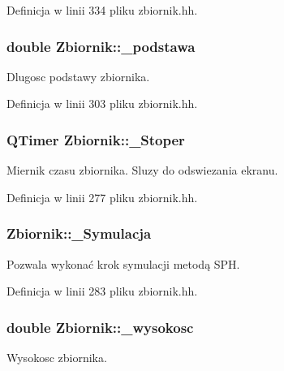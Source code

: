 Definicja w linii 334 pliku zbiornik.\-hh.

\hypertarget{class_zbiornik_aff57d3fb370566986df4eb58711cbfae}{
\subsubsection[{\-\_\-podstawa}]{\setlength{\rightskip}{0pt plus 5cm}double Zbiornik\-::\-\_\-podstawa\hspace{0.3cm}{\ttfamily [private]}}}\label{class_zbiornik_aff57d3fb370566986df4eb58711cbfae}
Dlugosc podstawy zbiornika. 

Definicja w linii 303 pliku zbiornik.\-hh.

\hypertarget{class_zbiornik_a5ca8ac1357ef59110d4a9e12aae2bd99}{
\subsubsection[{\-\_\-\-Stoper}]{\setlength{\rightskip}{0pt plus 5cm}Q\-Timer Zbiornik\-::\-\_\-\-Stoper}}\label{class_zbiornik_a5ca8ac1357ef59110d4a9e12aae2bd99}
Miernik czasu zbiornika. Sluzy do odswiezania ekranu. 

Definicja w linii 277 pliku zbiornik.\-hh.

\hypertarget{class_zbiornik_a2d1f5a0b8fb0085afcd66b730d6dd6a8}{
\subsubsection[{\-\_\-\-Symulacja}]{ Zbiornik\-::\-\_\-\-Symulacja}}\label{class_zbiornik_a2d1f5a0b8fb0085afcd66b730d6dd6a8}
Pozwala wykonać krok symulacji metodą S\-P\-H. 

Definicja w linii 283 pliku zbiornik.\-hh.

\hypertarget{class_zbiornik_abe4d7a4e2d39e802d656b03bb3afdd3f}{
\subsubsection[{\-\_\-wysokosc}]{\setlength{\rightskip}{0pt plus 5cm}double Zbiornik\-::\-\_\-wysokosc\hspace{0.3cm}{\ttfamily [private]}}}\label{class_zbiornik_abe4d7a4e2d39e802d656b03bb3afdd3f}
Wysokosc zbiornika. 

